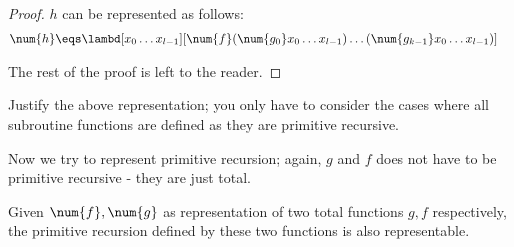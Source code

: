 \documentclass[../../../include/open-logic-section]{subfiles}
\begin{document}
\begin{proof}
  $h$ can be represented as follows:
  \begin{align}
    \num{h} &\eqs \lambd[x_0 \dots x_{l-1}][\num{f} (\num{g_0} x_0 \dots
              x_{l-1}) \dots (\num{g_{k-1}} x_0 \dots x_{l-1})]
  \end{align}

  The rest of the proof is left to the reader.
\end{proof}

\begin{prob}
  Justify the above representation; you only have to consider the
  cases where all subroutine functions are defined as they are primitive
  recursive.
\end{prob}

Now we try to represent primitive recursion; again,
$g$ and $f$ does not have to be primitive recursive - they are just
total.
\begin{lem}
  Given $\num{f},\num{g}$ as representation of two total
  functions $g,f$ respectively, the primitive recursion defined by
  these two functions is also representable.
\end{lem}
\end{document}
